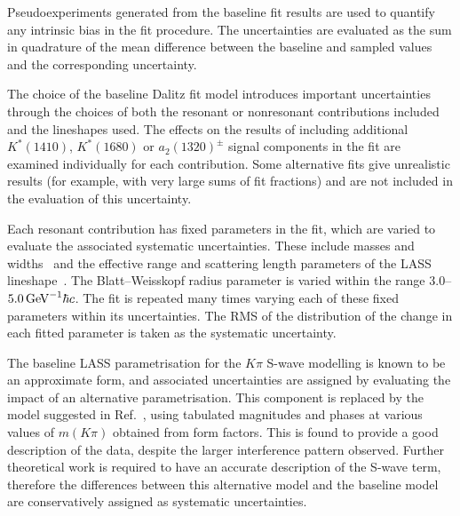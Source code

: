 Pseudoexperiments generated from the baseline fit results are used to quantify any intrinsic bias in the fit procedure. 
The uncertainties are evaluated as the sum in quadrature of the mean difference between the baseline and sampled values and the corresponding uncertainty. 

The choice of the baseline Dalitz fit model introduces important uncertainties through the choices of both the resonant or nonresonant contributions included and the lineshapes used.
The effects on the results of including additional $K^{*}(1410)$, $K^{*}(1680)$ or $a_{2}(1320)^{\pm}$ signal components in the fit are examined individually for each contribution. 
Some alternative fits give unrealistic results (for example, with very large sums of fit fractions) and are not included in the evaluation of this uncertainty.

Each resonant contribution has fixed parameters in the fit, which are varied to evaluate the associated systematic uncertainties. 
These include masses and widths~\cite{PDG2017} and the effective range and scattering length parameters of the LASS lineshape~\cite{PDG2017,lass2}.
The Blatt--Weisskopf radius parameter is varied within the range $3.0$--$5.0 \mathrm{\,Ge\kern -0.1em V}^{-1}\hbar c$.
The fit is repeated many times varying each of these fixed parameters within its uncertainties. 
The RMS of the distribution of the change in each fitted parameter is taken as the systematic uncertainty.

The baseline LASS parametrisation for the $K\pi$ S-wave modelling is known to be an approximate form, 
and associated uncertainties are assigned by evaluating the impact of an alternative parametrisation. 
This component is replaced by the model suggested in Ref.~\cite{ElBennich:2009da}, using tabulated magnitudes and phases at various values of $m(K\pi)$ obtained from form factors. 
This is found to provide a good description of the data, despite the larger interference pattern observed. 
Further theoretical work is required to have an accurate description of the S-wave term, therefore 
the differences between this alternative model and the baseline model are conservatively assigned as systematic uncertainties.

